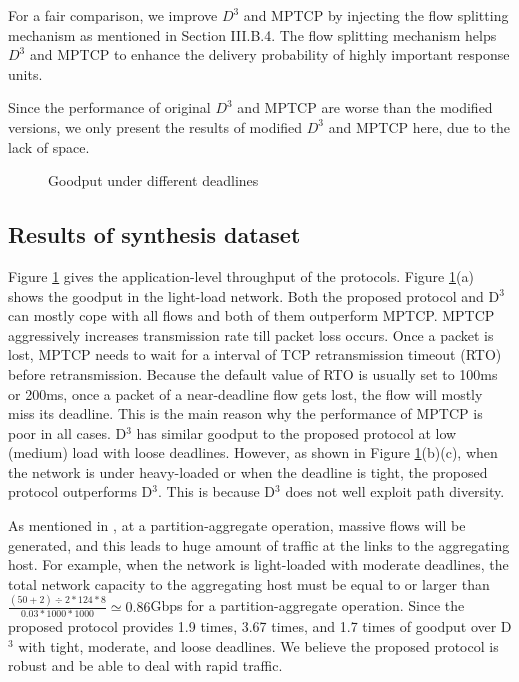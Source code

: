 \documentclass[conference]{IEEEtran}
\begin{document}
For a fair comparison, we improve $D^{3}$ and MPTCP by injecting the flow splitting mechanism as mentioned in Section III.B.4. The flow splitting mechanism helps $D^{3}$ and MPTCP to enhance the delivery probability of highly important response units.

Since the performance of original $D^{3}$ and MPTCP are worse than the modified versions, we only present the results of modified $D^{3}$ and MPTCP here, due to the lack of space.

\begin{figure}
  \centering
  \caption[what]{Goodput under different deadlines}\label{fig:gp}
\end{figure}

\subsection{Results of synthesis dataset}

Figure \ref{fig:gp} gives the application-level throughput of the protocols. Figure \ref{fig:gp}(a) shows the goodput in the light-load network. Both the proposed protocol and D$^{3}$ can mostly cope with all flows and both of them outperform MPTCP. MPTCP aggressively increases transmission rate till packet loss occurs. Once a packet is lost, MPTCP needs to wait for a interval of TCP retransmission timeout (RTO) before retransmission. Because the default value of RTO is usually set to 100ms or 200ms, once a packet of a near-deadline flow gets lost, the flow will mostly miss its deadline. This is the main reason why the performance of MPTCP is poor in all cases. D$^{3}$ has similar goodput to the proposed protocol at low (medium) load with loose deadlines. However, as shown in Figure \ref{fig:gp}(b)(c), when the network is under heavy-loaded or when the deadline is tight, the proposed protocol outperforms D$^{3}$. This is because D$^{3}$ does not well exploit path diversity.

As mentioned in \cite{incast2}, at a partition-aggregate operation, massive flows will be generated, and this leads to huge amount of traffic at the links to the aggregating host. For example, when the network is light-loaded with moderate deadlines, the total network capacity to the aggregating host must be equal to or larger than $\frac{(50+2)\div2\ast124\ast8}{0.03\ast1000\ast1000}\simeq0.86$Gbps for a partition-aggregate operation. Since the proposed protocol provides 1.9 times, 3.67 times, and 1.7 times of goodput over D$^{3}$ with tight, moderate, and loose deadlines. We believe the proposed protocol is robust and be able to deal with rapid traffic.
\end{document}

